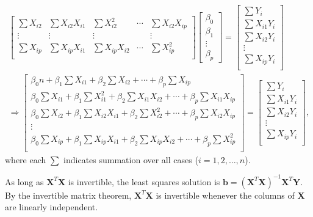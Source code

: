\documentclass[11pt]{exam} %
\begin{document}
\begin{questions}
\begin{gather*}
\begin{bmatrix}
  	\sum X_{i2} & \sum X_{i2} X_{i1} & \sum X_{i2}^2 & \cdots & \sum X_{i2} X_{ip} \\
  	\vdots & \vdots & \vdots &  & \vdots \\
  	\sum X_{ip} & \sum X_{ip} X_{i1} & \sum X_{ip} X_{i2} & \cdots & \sum X_{ip}^2 \\
  \end{bmatrix}
  \begin{bmatrix}
    \beta_0 \\
    \beta_1 \\
    \vdots \\
    \beta_p
  \end{bmatrix}
=
  \begin{bmatrix}
    \sum Y_{i} \\
    \sum X_{i1} Y_i \\
    \sum X_{i2} Y_i \\
    \vdots \\
    \sum X_{ip} Y_i \\
  \end{bmatrix}
\\
\Rightarrow \begin{bmatrix}
  	\beta_0 n + \beta_1 \sum X_{i1} + \beta_2 \sum X_{i2} + \cdots + \beta_p \sum X_{ip} \\
  	\beta_0 \sum X_{i1} + \beta_1 \sum X_{i1}^2 + \beta_2 \sum X_{i1} X_{i2 } + \cdots + \beta_p \sum X_{i1} X_{ip} \\
  	\beta_0 \sum X_{i2} + \beta_1 \sum X_{i2} X_{i1} + \beta_2 \sum X_{i2}^2 + \cdots + \beta_p \sum X_{i2} X_{ip} \\
  	\vdots \\
  	\beta_0 \sum X_{ip} + \beta_1 \sum X_{ip} X_{i1} + \beta_2 \sum X_{ip} X_{i2} + \cdots + \beta_p \sum X_{ip}^2 \\
  \end{bmatrix}
=
  \begin{bmatrix}
    \sum Y_{i} \\
    \sum X_{i1} Y_i \\
    \sum X_{i2} Y_i \\
    \vdots \\
    \sum X_{ip} Y_i \\
  \end{bmatrix} ,
\end{gather*}
where each $\sum$ indicates summation over all cases ($i = 1, 2, \ldots, n$).

As long as $\mathbf{X}^T \mathbf{X}$ is invertible, the least squares solution is $\mathbf{b} = (\mathbf{X}^T \mathbf{X})^{-1} \mathbf{X}^T \mathbf{Y}$. By the invertible matrix theorem, $\mathbf{X}^T \mathbf{X}$ is invertible whenever the columns of $\mathbf{X}$ are linearly independent.


\end{questions}
\end{document}
